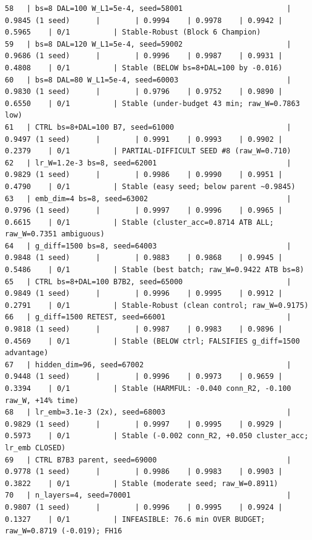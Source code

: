 \begin{tiny}
\begin{verbatim}
58   | bs=8 DAL=100 W_L1=5e-4, seed=58001                        | 0.9845 (1 seed)      |        | 0.9994    | 0.9978    | 0.9942 | 0.5965    | 0/1          | Stable-Robust (Block 6 Champion)
59   | bs=8 DAL=120 W_L1=5e-4, seed=59002                        | 0.9686 (1 seed)      |        | 0.9996    | 0.9987    | 0.9931 | 0.4808    | 0/1          | Stable (BELOW bs=8+DAL=100 by -0.016)
60   | bs=8 DAL=80 W_L1=5e-4, seed=60003                         | 0.9830 (1 seed)      |        | 0.9796    | 0.9752    | 0.9890 | 0.6550    | 0/1          | Stable (under-budget 43 min; raw_W=0.7863 low)
61   | CTRL bs=8+DAL=100 B7, seed=61000                          | 0.9497 (1 seed)      |        | 0.9991    | 0.9993    | 0.9902 | 0.2379    | 0/1          | PARTIAL-DIFFICULT SEED #8 (raw_W=0.710)
62   | lr_W=1.2e-3 bs=8, seed=62001                              | 0.9829 (1 seed)      |        | 0.9986    | 0.9990    | 0.9951 | 0.4790    | 0/1          | Stable (easy seed; below parent ~0.9845)
63   | emb_dim=4 bs=8, seed=63002                                | 0.9796 (1 seed)      |        | 0.9997    | 0.9996    | 0.9965 | 0.6615    | 0/1          | Stable (cluster_acc=0.8714 ATB ALL; raw_W=0.7351 ambiguous)
64   | g_diff=1500 bs=8, seed=64003                              | 0.9848 (1 seed)      |        | 0.9883    | 0.9868    | 0.9945 | 0.5486    | 0/1          | Stable (best batch; raw_W=0.9422 ATB bs=8)
65   | CTRL bs=8+DAL=100 B7B2, seed=65000                        | 0.9849 (1 seed)      |        | 0.9996    | 0.9995    | 0.9912 | 0.2791    | 0/1          | Stable-Robust (clean control; raw_W=0.9175)
66   | g_diff=1500 RETEST, seed=66001                            | 0.9818 (1 seed)      |        | 0.9987    | 0.9983    | 0.9896 | 0.4569    | 0/1          | Stable (BELOW ctrl; FALSIFIES g_diff=1500 advantage)
67   | hidden_dim=96, seed=67002                                 | 0.9448 (1 seed)      |        | 0.9996    | 0.9973    | 0.9659 | 0.3394    | 0/1          | Stable (HARMFUL: -0.040 conn_R2, -0.100 raw_W, +14% time)
68   | lr_emb=3.1e-3 (2x), seed=68003                            | 0.9829 (1 seed)      |        | 0.9997    | 0.9995    | 0.9929 | 0.5973    | 0/1          | Stable (-0.002 conn_R2, +0.050 cluster_acc; lr_emb CLOSED)
69   | CTRL B7B3 parent, seed=69000                              | 0.9778 (1 seed)      |        | 0.9986    | 0.9983    | 0.9903 | 0.3822    | 0/1          | Stable (moderate seed; raw_W=0.8911)
70   | n_layers=4, seed=70001                                    | 0.9807 (1 seed)      |        | 0.9996    | 0.9995    | 0.9924 | 0.1327    | 0/1          | INFEASIBLE: 76.6 min OVER BUDGET; raw_W=0.8719 (-0.019); FH16

\end{verbatim}
\end{tiny}
